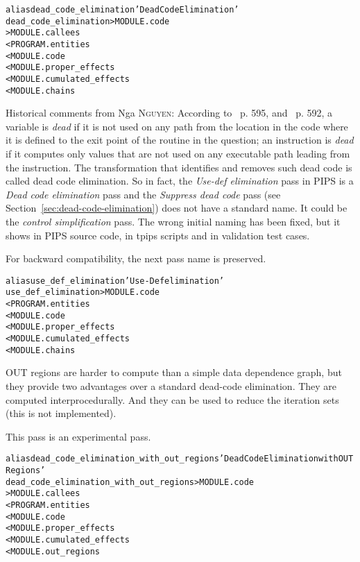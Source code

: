 \documentclass[a4paper]{report}
\newenvironment{PipsMake}{\begin{alltt}}{\end{alltt}}
\newenvironment{PipsPass}[1]{\label{pass:#1}}{}
\begin{document}
\begin{PipsMake}
alias dead_code_elimination 'Dead Code Elimination'
dead_code_elimination          > MODULE.code
                               > MODULE.callees
        < PROGRAM.entities
        < MODULE.code
        < MODULE.proper_effects
        < MODULE.cumulated_effects
        < MODULE.chains
\end{PipsMake}

Historical comments from Nga \textsc{Nguyen}: According
to~\cite{ASU86} p. 595, and~\cite{Muc97} p. 592, a variable is {\it
  dead} if it is not used on any path from the location in the code
where it is defined to the exit point of the routine in the question;
an instruction is {\it dead} if it computes only values that are not
used on any executable path leading from the instruction. The
transformation that identifies and removes such dead code is called
dead code elimination. So in fact, the {\em Use-def elimination} pass
in PIPS is a {\em Dead code elimination} pass and the {\em Suppress
  dead code} pass (see Section~\ref{sec:dead-code-elimination}) does
not have a standard name. It could be the {\em control simplification}
pass. The wrong initial naming has been fixed, but it shows in PIPS
source code, in tpips scripts and in validation test cases.

For backward compatibility, the next pass name is preserved.

\begin{PipsMake}
alias use_def_elimination 'Use-Def elimination'
use_def_elimination          > MODULE.code
        < PROGRAM.entities
        < MODULE.code
        < MODULE.proper_effects
        < MODULE.cumulated_effects
        < MODULE.chains
\end{PipsMake}

\begin{PipsPass}{dead_code_elimination_with_out_regions}
OUT regions are harder to compute than a simple data dependence graph,
but they provide two advantages over a standard dead-code
elimination. They are computed interprocedurally. And they can be used
to reduce the iteration sets (this is not implemented).

This pass is an experimental pass.
\end{PipsPass}

\begin{PipsMake}
alias dead_code_elimination_with_out_regions 'Dead Code Elimination with OUT Regions'
dead_code_elimination_with_out_regions          > MODULE.code
                                               > MODULE.callees
        < PROGRAM.entities
        < MODULE.code
        < MODULE.proper_effects
        < MODULE.cumulated_effects
        < MODULE.out_regions
\end{PipsMake}
\end{document}
